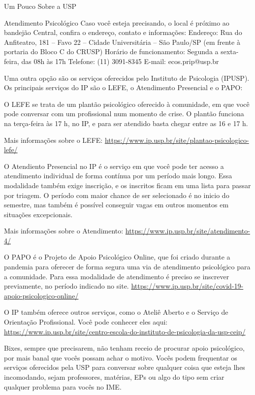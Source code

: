 \begin{secao}{Um Pouco Sobre a USP}
\begin{subsecao}{Atendimento Psicológico}
Caso você esteja precisando, o local é próximo ao bandejão Central, confira o endereço, contato e informações: 
Endereço: Rua do Anfiteatro, 181 – Favo 22 – Cidade Universitária – São Paulo/SP (em frente à portaria do Bloco C do CRUSP)
Horário de funcionamento: Segunda a sexta-feira, das 08h às 17h
Telefone: (11) 3091-8345
E-mail: ecos.prip@usp.br

Uma outra opção são os serviços oferecidos pelo Instituto de Psicologia (IPUSP).
Os principais serviços do IP são o LEFE, o Atendimento Presencial e o PAPO:

O LEFE se trata de um plantão psicológico oferecido à comunidade, em que
você pode conversar com um profissional num momento de crise. O plantão 
funciona na terça-feira às 17 h, no IP, e para ser atendido basta chegar 
entre as 16 e 17 h.

Mais informações sobre o LEFE: 
\url{https://www.ip.usp.br/site/plantao-psicologico-lefe/}

O Atendiento Presencial no IP é o serviço em que você pode ter acesso a
atendimento individual de forma contínua por um período mais longo. Essa
modalidade também exige inscrição, e os inscritos ficam em uma lista para
passar por triagem. O período com maior chance de ser selecionado é no inicio
do semestre, mas também é possível conseguir vagas em outros momentos em 
situações excepcionais. 

Mais informações sobre o Atendimento:
\url{https://www.ip.usp.br/site/atendimento-4/}

O PAPO é o Projeto de Apoio Psicológico Online, que foi criado durante a 
pandemia para oferecer de forma segura uma via de atendimento psicológico
para a comunidade. Para essa modalidade de atendimento é preciso se inscrever
previamente, no período indicado no site.
\url{https://www.ip.usp.br/site/covid-19-apoio-psicologico-online/}

O IP também oferece outros serviços, como o Ateliê Aberto e o Serviço
de Orientação Profissional. Você pode conhecer eles aqui:
\url{https://www.ip.usp.br/site/centro-escola-do-instituto-de-psicologia-da-usp-ceip/}


Bixes, sempre que precisarem, não tenham receio de procurar apoio
psicológico, por mais banal que vocês possam achar o motivo. Vocês
podem frequentar os serviços oferecidos pela USP para conversar sobre
qualquer coisa que esteja lhes incomodando, sejam professores,
matérias, EPs ou algo do tipo sem criar qualquer
problema para vocês no IME.

\end{subsecao}


\end{secao}

